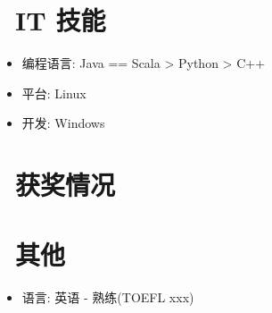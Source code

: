 \documentclass{resume}
\begin{document}

\section{\faCogs\ IT 技能}
\begin{itemize}[parsep=0.5ex]
  \item 编程语言: Java == Scala > Python > C++
  \item 平台: Linux
  \item 开发: Windows
\end{itemize}

\section{\faHeartO\ 获奖情况}

\section{\faInfo\ 其他}
\begin{itemize}[parsep=0.5ex]
  \item 语言: 英语 - 熟练(TOEFL xxx)
\end{itemize}

%
%
\end{document}
